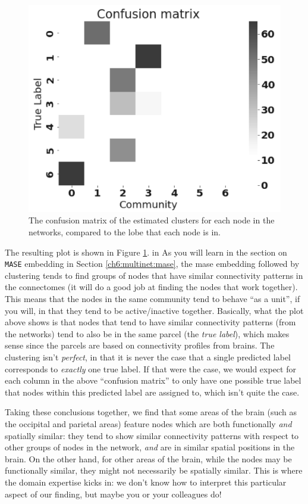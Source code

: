 \begin{figure}[h]
    \centering
    \includegraphics[width=0.5\linewidth]{foundations/ch2/Images/cf_mtx.png}
    \caption[Confusion matrix for node predictions]{The confusion matrix of the estimated clusters for each node in the networks, compared to the lobe that each node is in.}
    \label{fig:ch2:cf_mtx}
\end{figure}
The resulting plot is shown in Figure \ref{fig:ch2:cf_mtx}. in As you will learn in the section on \texttt{MASE} embedding in Section \ref{ch6:multinet:mase}, the mase embedding followed by clustering tends to find groups of nodes that have similar connectivity patterns in the connectomes (it will do a good job at finding the nodes that work together). This means that the nodes in the same community tend to behave ``as a unit'', if you will, in that they tend to be active/inactive together. Basically, what the plot above shows is that nodes that tend to have similar connectivity patterns (from the networks) tend to also be in the same parcel (the \emph{true label}), which makes sense since the parcels are based on connectivity profiles from brains. The clustering isn't \emph{perfect}, in that it is never the case that a single predicted label corresponds to \emph{exactly} one true label. If that were the case, we would expect for each column in the above ``confusion matrix'' to only have one possible true label that nodes within this predicted label are assigned to, which isn't quite the case. 

Taking these conclusions together, we find that some areas of the brain (such as the occipital and parietal areas) feature nodes which are both functionally \emph{and} spatially similar: they tend to show similar connectivity patterns with respect to other groups of nodes in the network, \emph{and} are in similar spatial positions in the brain. On the other hand, for other areas of the brain, while the nodes may be functionally similar, they might not necessarily be spatially similar. This is where the domain expertise kicks in: we don't know how to interpret this particular aspect of our finding, but maybe you or your colleagues do!

